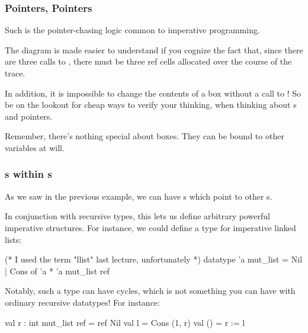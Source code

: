 \documentclass[aspectratio=169]{beamer}
\begin{document}
\begin{frame}[fragile]
  \frametitle{Pointers, Pointers}

  Such is the pointer-chasing logic common to imperative programming.

  \pause
  \vspace{\fill}

  The diagram is made easier to understand if you cognize the fact that, since
  there are three calls to , there must be three ref cells allocated
  over the course of the trace.

  \pause
  \vspace{\fill}

  In addition, it is impossible to change the contents of a box without a
  call to \code{:=}! So be on the lookout for cheap ways to verify your
  thinking, when thinking about s and pointers.

  \pause
  \vspace{\fill}

  Remember, there's nothing special about boxes. They can be bound to other
  variables at will.

  \vspace{\fill}

\end{frame}

\begin{frame}[fragile]
  \frametitle{s within s}

  As we saw in the previous example, we can have s which point
  to other s.

  \pause
  \vspace{\fill}

  In conjunction with recursive types, this lets us define arbitrary powerful
  imperative structures. For instance, we could define a type for imperative
  linked lists:

  \pause
  \vspace{\fill}

  \begin{codeblock}
    (* I used the term "llist" last lecture, unfortunately *)
    datatype 'a mut_list = Nil | Cons of 'a * 'a mut_list ref
  \end{codeblock}

  \pause
  \vspace{\fill}

  Notably, such a type can have cycles, which is not something you can have
  with ordinary recursive datatypes! For instance:

  \begin{codeblock}
    val r : int mut_list ref = ref Nil
    val l = Cons (1, r)
    val () = r := l
  \end{codeblock}
\end{frame}
\end{document}

